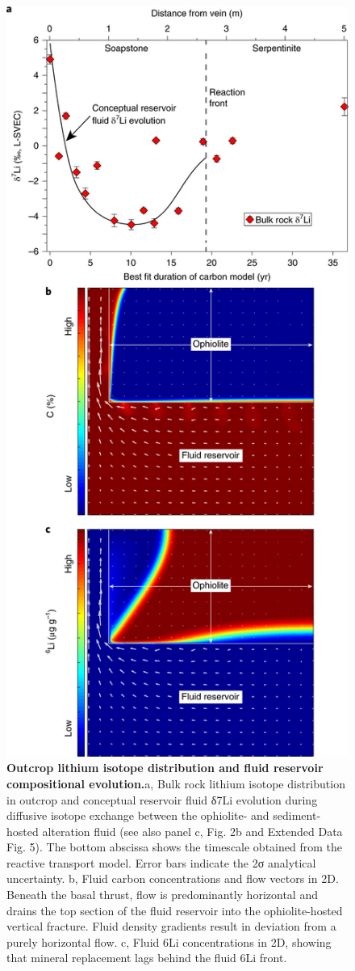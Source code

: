 \begin{figure}[ht]
	\centering
	\includegraphics[width=0.5\linewidth]{figures/fig4.png}
	\caption{\textbf{Outcrop lithium isotope distribution and fluid reservoir compositional evolution.}a, Bulk rock lithium isotope distribution in outcrop and conceptual reservoir fluid δ7Li evolution during diffusive isotope exchange between the ophiolite- and sediment-hosted alteration fluid (see also panel c, Fig. 2b and Extended Data Fig. 5). The bottom abscissa shows the timescale obtained from the reactive transport model. Error bars indicate the 2σ analytical uncertainty. b, Fluid carbon concentrations and flow vectors in 2D. Beneath the basal thrust, flow is predominantly horizontal and drains the top section of the fluid reservoir into the ophiolite-hosted vertical fracture. Fluid density gradients result in deviation from a purely horizontal flow. c, Fluid 6Li concentrations in 2D, showing that mineral replacement lags behind the fluid 6Li front.}
	\label{fig:fig4}
\end{figure}

